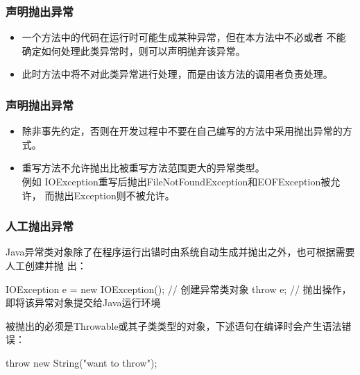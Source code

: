 \begin{frame}[fragile] %
  \frametitle{声明抛出异常}


  \begin{itemize}
  \item 一个方法中的代码在运行时可能生成某种异常，但在本方法中不必或者
    不能确定如何处理此类异常时，则可以声明抛弃该异常。
  \item 此时方法中将不对此类异常进行处理，而是由该方法的调用者负责处理。
  \end{itemize}

\end{frame}


\begin{frame}[fragile] %
\frametitle{声明抛出异常}


\begin{itemize}
\item 除非事先约定，否则在开发过程中不要在自己编写的方法中采用抛出异常的方式。
\item {\hei\Red 重写方法不允许抛出比被重写方法范围更大的异常类型。}\\
  例如 IOException重写后抛出FileNotFoundException和EOFException被允许，
  而抛出Exception则不被允许。
\end{itemize}
\end{frame}

\begin{frame}[fragile] %
  \frametitle{人工抛出异常}

  Java异常类对象除了在程序运行出错时由系统自动生成并抛出之外，也可根据需要人工创建并抛
  出：
  \begin{javaCode}
    IOException e = new IOException(); // 创建异常类对象
    throw e; // 抛出操作，即将该异常对象提交给Java运行环境
  \end{javaCode}

  被抛出的必须是Throwable或其子类类型的对象，下述语句在编译时会产生语法错误：

  \begin{javaCode}
    throw new String("want to throw");  
  \end{javaCode}

\end{frame}

